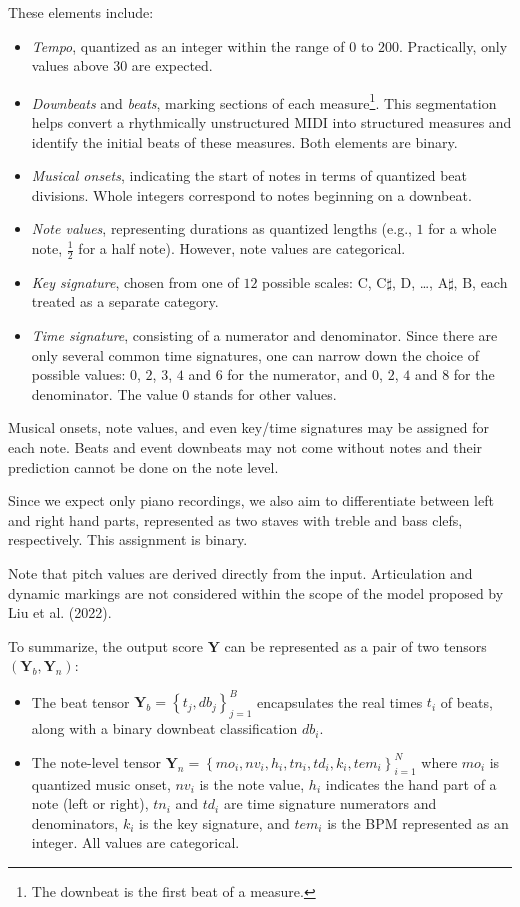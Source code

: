 These elements include:
\begin{itemize}
	\item \emph{Tempo}, quantized as an integer within the range of $0$ to $200$. Practically, only values above $30$ are  expected.
	\item \emph{Downbeats} and \emph{beats}, marking sections of each measure\footnote{The downbeat is the first beat of a measure.}. This segmentation helps convert a rhythmically unstructured MIDI into structured measures and identify the initial beats of these measures. Both elements are binary.
	\item \emph{Musical onsets}, indicating the start of notes in terms of quantized beat divisions. Whole integers correspond to notes beginning on a downbeat.
	\item \emph{Note values}, representing durations as quantized lengths (e.g., $1$ for a whole note, $\frac{1}{2}$ for a half note). However, note values are categorical.
	\item \emph{Key signature}, chosen from one of $12$ possible scales: $\textrm{C}$, $\textrm{C}\sharp$, $\textrm{D}$, \ldots, $\textrm{A}\sharp$, $\textrm{B}$, each treated as a separate category.
	\item \emph{Time signature}, consisting of a numerator and denominator. Since there are only several common time signatures, one can narrow down the choice of possible values: $0$, $2$, $3$, $4$ and $6$ for the numerator, and $0$, $2$, $4$ and $8$ for the denominator. The value $0$ stands for other values.
\end{itemize}

Musical onsets, note values, and even key/time signatures may be assigned for each note. Beats and event downbeats may not come without notes and their prediction cannot be done on the note level.

Since we expect only piano recordings, we also aim to differentiate between left and right hand parts, represented as two staves with treble and bass clefs, respectively. This assignment is binary.

Note that pitch values are derived directly from the input. Articulation and dynamic markings are not considered within the scope of the model proposed by Liu et al. (2022).

To summarize, the output score $\mathbf{Y}$ can be represented as a pair of two tensors $\left(\mathbf{Y}_b, \mathbf{Y}_n\right)$:
\begin{itemize}
	\item The beat tensor $\mathbf{Y}_b = \left\{t_j, db_j\right\}_{j=1}^B$ encapsulates the real times $t_i$ of beats, along with a binary downbeat classification $db_i$.
	\item The note-level tensor $\mathbf{Y}_n=\left\{mo_i, nv_i, h_i, tn_i, td_i, k_i, tem_i\right\}_{i=1}^N$ where $mo_i$ is quantized music onset, $nv_i$ is the note value, $h_i$ indicates the hand part of a note (left or right), $tn_i$ and $td_i$ are time signature numerators and denominators, $k_i$ is the key signature, and $tem_i$ is the BPM represented as an integer. All values are categorical.
\end{itemize}

